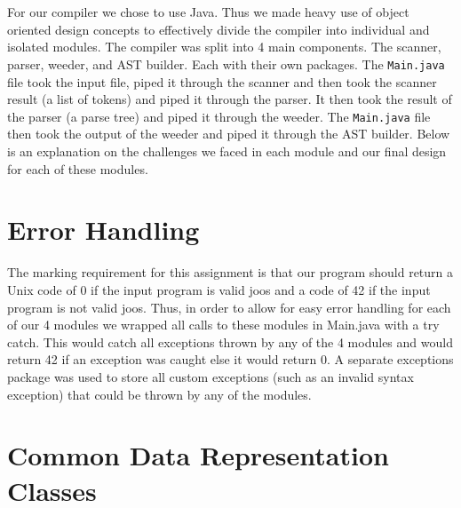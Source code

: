 \documentclass[12pt]{article}
\begin{document}
\section*{}

For our compiler we chose to use Java. Thus we made heavy use of object oriented design concepts to
effectively divide the compiler into individual and isolated modules. The compiler was split into 4
main components. The scanner, parser, weeder, and AST builder. Each with their own packages. The
\texttt{Main.java} file took the input file, piped it through the scanner and then took the scanner
result (a list of tokens) and piped it through the parser. It then took the result of the parser (a
parse tree) and piped it through the weeder. The \texttt{Main.java} file then took the output of the
weeder and piped it through the AST builder. Below is an explanation on the challenges we faced in
each module and our final design for each of these modules.

\section*{Error Handling}

The marking requirement for this assignment is that our program should return a Unix code of 0 if
the input program is valid joos and a code of 42 if the input program is not valid joos. Thus, in
order to allow for easy error handling for each of our 4 modules we wrapped all calls to these
modules in Main.java with a try catch. This would catch all exceptions thrown by any of the 4
modules and would return 42 if an exception was caught else it would return 0. A separate exceptions
package was used to store all custom exceptions (such as an invalid syntax exception) that could be
thrown by any of the modules.

\section*{Common Data Representation Classes}
\end{document}
